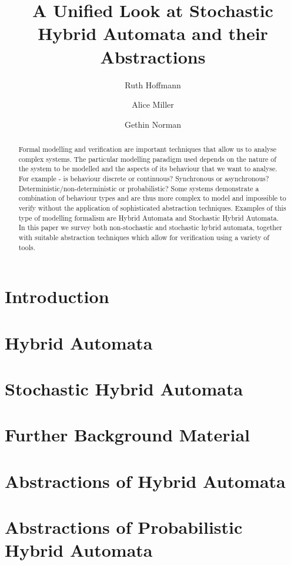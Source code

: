 \documentclass[format=acmsmall]{acmart}
\title{A Unified Look at Stochastic Hybrid Automata and their Abstractions}
\author{Ruth Hoffmann}
\affiliation{University of Glasgow}
\author{Alice Miller}
\affiliation{University of Glasgow}
\author{Gethin Norman}
\affiliation{University of Glasgow}
\begin{document}
\begin{abstract}
Formal modelling and verification are important techniques that allow us to analyse complex systems. The particular modelling paradigm used depends on the nature of the system to be modelled and the aspects of its behaviour that we want to analyse. For example - is behaviour discrete or continuous? Synchronous or asynchronous? Deterministic/non-deterministic or probabilistic? Some systems demonstrate a combination of behaviour types and are thus more complex to model and impossible to verify without the application of sophisticated abstraction techniques. Examples of this type of  modelling formalism are Hybrid Automata and Stochastic Hybrid Automata.  In this paper we survey both non-stochastic and stochastic hybrid automata, together with suitable abstraction techniques which allow for verification using  a variety of tools.
\end{abstract}

\maketitle

\section{Introduction}
\label{sec:intro}


\section{Hybrid Automata}
\label{sec:hybrid}


\section{Stochastic Hybrid Automata}
\label{sec:stoch}



\section{Further Background Material}
\label{sec:background}


\section{Abstractions of Hybrid Automata}
\label{sec:abs}


\section{Abstractions of Probabilistic Hybrid Automata}
\label{sec:propabs}

\end{document}
